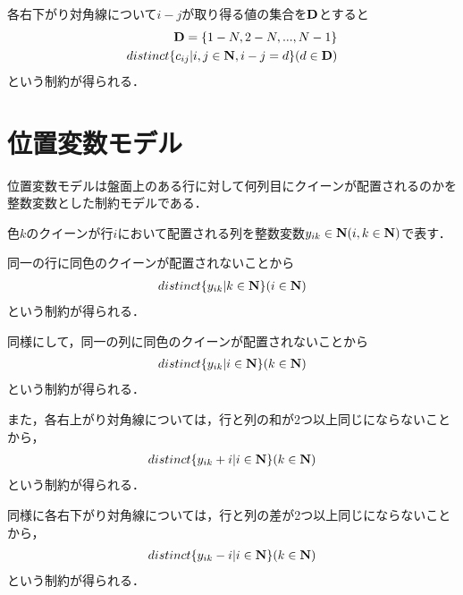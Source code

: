 各右下がり対角線について$i-j$が取り得る値の集合を$\bf D$とすると
\begin{eqnarray*}
    {\bf D} = \{1-N,2-N,...,N-1\} \\
    distinct\{c_{ij} | i,j \in {\bf N}, i-j=d \} (d \in {\bf D})
\end{eqnarray*}
という制約が得られる．

\section{位置変数モデル}
位置変数モデルは盤面上のある行に対して何列目にクイーンが配置されるのかを整数変数とした制約モデルである．

色$k$のクイーンが行$i$において配置される列を整数変数$y_{ik} \in {\bf N} (i,k \in {\bf N})$で表す．

同一の行に同色のクイーンが配置されないことから
\begin{eqnarray*}
    distinct\{y_{ik} | k \in {\bf N} \} (i \in {\bf N})
\end{eqnarray*}
という制約が得られる．

同様にして，同一の列に同色のクイーンが配置されないことから
\begin{eqnarray*}
    distinct\{y_{ik} | i \in {\bf N} \} (k \in {\bf N})
\end{eqnarray*}
という制約が得られる．

また，各右上がり対角線については，行と列の和が2つ以上同じにならないことから，
\begin{eqnarray*}
    distinct\{y_{ik}+i | i \in {\bf N} \} (k \in {\bf N})
\end{eqnarray*}
という制約が得られる．

同様に各右下がり対角線については，行と列の差が2つ以上同じにならないことから，
\begin{eqnarray*}
    distinct\{y_{ik}-i | i \in {\bf N} \} (k \in {\bf N})
\end{eqnarray*}
という制約が得られる．


